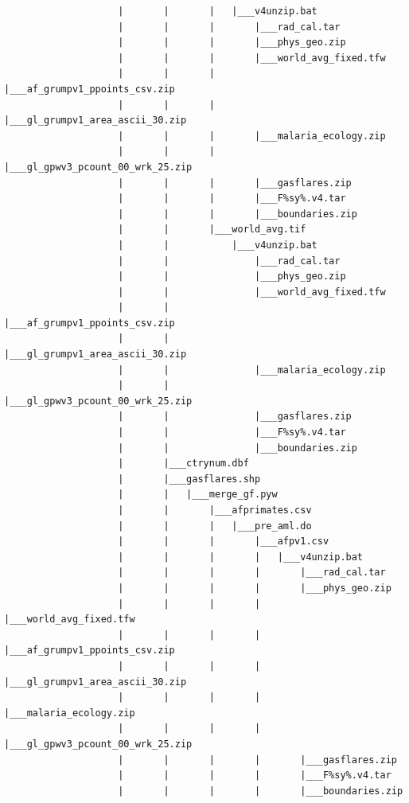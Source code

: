 \documentclass[
]{book}
\begin{document}
\begin{verbatim}
                    |       |       |   |___v4unzip.bat
                    |       |       |       |___rad_cal.tar
                    |       |       |       |___phys_geo.zip
                    |       |       |       |___world_avg_fixed.tfw
                    |       |       |       |___af_grumpv1_ppoints_csv.zip
                    |       |       |       |___gl_grumpv1_area_ascii_30.zip
                    |       |       |       |___malaria_ecology.zip
                    |       |       |       |___gl_gpwv3_pcount_00_wrk_25.zip
                    |       |       |       |___gasflares.zip
                    |       |       |       |___F%sy%.v4.tar
                    |       |       |       |___boundaries.zip
                    |       |       |___world_avg.tif
                    |       |           |___v4unzip.bat
                    |       |               |___rad_cal.tar
                    |       |               |___phys_geo.zip
                    |       |               |___world_avg_fixed.tfw
                    |       |               |___af_grumpv1_ppoints_csv.zip
                    |       |               |___gl_grumpv1_area_ascii_30.zip
                    |       |               |___malaria_ecology.zip
                    |       |               |___gl_gpwv3_pcount_00_wrk_25.zip
                    |       |               |___gasflares.zip
                    |       |               |___F%sy%.v4.tar
                    |       |               |___boundaries.zip
                    |       |___ctrynum.dbf
                    |       |___gasflares.shp
                    |       |   |___merge_gf.pyw
                    |       |       |___afprimates.csv
                    |       |       |   |___pre_aml.do
                    |       |       |       |___afpv1.csv
                    |       |       |       |   |___v4unzip.bat
                    |       |       |       |       |___rad_cal.tar
                    |       |       |       |       |___phys_geo.zip
                    |       |       |       |       |___world_avg_fixed.tfw
                    |       |       |       |       |___af_grumpv1_ppoints_csv.zip
                    |       |       |       |       |___gl_grumpv1_area_ascii_30.zip
                    |       |       |       |       |___malaria_ecology.zip
                    |       |       |       |       |___gl_gpwv3_pcount_00_wrk_25.zip
                    |       |       |       |       |___gasflares.zip
                    |       |       |       |       |___F%sy%.v4.tar
                    |       |       |       |       |___boundaries.zip

\end{verbatim}
\end{document}

